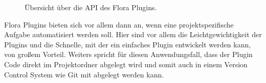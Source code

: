 \begin{figure}
    \centering
    \caption{Übersicht über die API des Flora Plugins.}
    \label{fig:FloraPluginAPI}
\end{figure}    
 
Flora Plugins bieten sich vor allem dann an, wenn eine projektspezifische 
Aufgabe automatisiert werden soll. Hier sind vor allem die 
Leichtgewichtigkeit der Plugins und die Schnelle, mit der ein 
einfaches Plugin entwickelt werden kann, von großem Vorteil. 
Weiters spricht für diesen Anwendungsfall, dass der Plugin Code 
direkt im Projektordner abgelegt wird und somit auch in einem Version 
Control System wie Git mit abgelegt werden kann.


